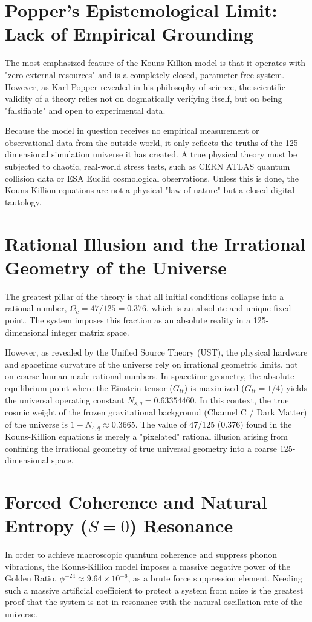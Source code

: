 \documentclass[12pt,a4paper]{article}
\begin{document}
\section{Popper's Epistemological Limit: Lack of Empirical Grounding}
The most emphasized feature of the Kouns-Killion model is that it operates with "zero external resources" and is a completely closed, parameter-free system. However, as Karl Popper revealed in his philosophy of science, the scientific validity of a theory relies not on dogmatically verifying itself, but on being "falsifiable" and open to experimental data. 

Because the model in question receives no empirical measurement or observational data from the outside world, it only reflects the truths of the 125-dimensional simulation universe it has created. A true physical theory must be subjected to chaotic, real-world stress tests, such as CERN ATLAS quantum collision data or ESA Euclid cosmological observations. Unless this is done, the Kouns-Killion equations are not a physical "law of nature" but a closed digital tautology.

\section{Rational Illusion and the Irrational Geometry of the Universe}
The greatest pillar of the theory is that all initial conditions collapse into a rational number, $\Omega_c = 47/125 = 0.376$, which is an absolute and unique fixed point. The system imposes this fraction as an absolute reality in a 125-dimensional integer matrix space.

However, as revealed by the Unified Source Theory (UST), the physical hardware and spacetime curvature of the universe rely on irrational geometric limits, not on coarse human-made rational numbers. In spacetime geometry, the absolute equilibrium point where the Einstein tensor ($G_{tt}$) is maximized ($G_{tt} = 1/4$) yields the universal operating constant $N_{s,q} = 0.63354460$. In this context, the true cosmic weight of the frozen gravitational background (Channel C / Dark Matter) of the universe is $1 - N_{s,q} \approx 0.3665$. The value of $47/125$ ($0.376$) found in the Kouns-Killion equations is merely a "pixelated" rational illusion arising from confining the irrational geometry of true universal geometry into a coarse 125-dimensional space.

\section{Forced Coherence and Natural Entropy ($S=0$) Resonance}
In order to achieve macroscopic quantum coherence and suppress phonon vibrations, the Kouns-Killion model imposes a massive negative power of the Golden Ratio, $\phi^{-24} \approx 9.64 \times 10^{-6}$, as a brute force suppression element. Needing such a massive artificial coefficient to protect a system from noise is the greatest proof that the system is not in resonance with the natural oscillation rate of the universe.
\end{document}
